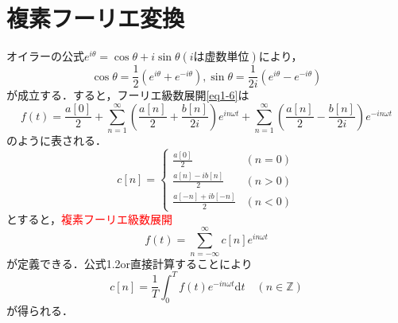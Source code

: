 \documentclass[a4j]{jsbook}
\numberwithin{theorem}{chapter}  %
\begin{document}
\section{複素フーリエ変換} \label{sec1-3}
オイラーの公式\(e^{i\theta}=\cos\theta+i\sin\theta(i\mbox{は虚数単位})\)により，
\begin{equation*}
    \cos\theta=\frac{1}{2}\left(e^{i\theta}+e^{-i\theta}\right), \sin\theta=\frac{1}{2i}\left(e^{i\theta}-e^{-i\theta}\right)
\end{equation*}
が成立する．すると，フーリエ級数展開\eqref{eq1-6}は
\begin{equation*}
    f(t)=\frac{a[0]}{2}+\sum_{n=1}^\infty\left(\frac{a[n]}{2}+\frac{b[n]}{2i}\right)e^{in\omega t}+\sum_{n=1}^\infty\left(\frac{a[n]}{2}-\frac{b[n]}{2i}\right)e^{-in\omega t}
\end{equation*}
のように表される．
\begin{equation*}
    c[n]=\begin{cases}
    \frac{a[0]}{2} & (n=0) \\
    \frac{a[n]-ib[n]}{2} & (n>0) \\
    \frac{a[-n]+ib[-n]}{2} & (n<0)
    \end{cases}
\end{equation*}
とすると，\textcolor{red}{複素フーリエ級数展開}
\begin{equation}
    f(t)=\sum_{n=-\infty}^\infty c[n]e^{in\omega t}
\end{equation}
が定義できる．公式1.2or直接計算することにより
\begin{equation*}
    c[n]=\frac{1}{T}\int_0^T f(t)e^{-in\omega t}\mathrm{d}t\quad (n\in\mathbb{Z})
\end{equation*}
が得られる．
\end{document}
